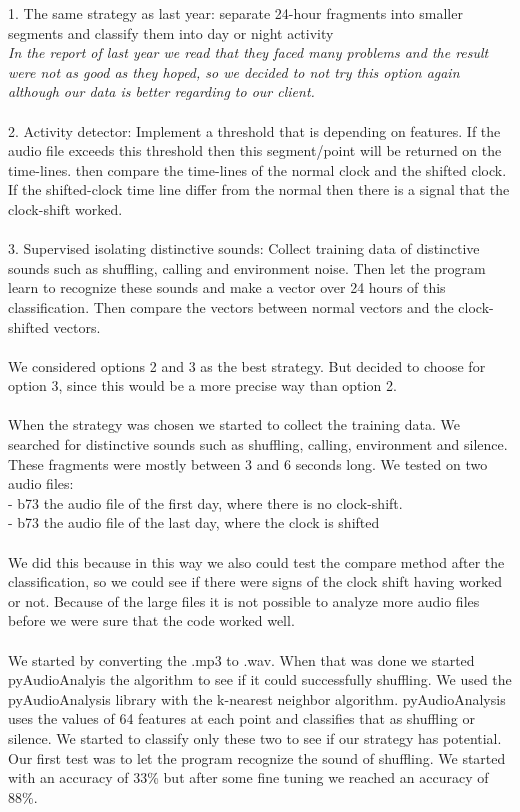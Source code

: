 \documentclass[a4paper]{article}
\begin{document}
1. The same strategy as last year: separate 24-hour fragments into smaller segments and classify them into day or night activity\\
\emph{In the report of last year we read that they faced many problems and the result were not as good as they hoped, so we decided to not try this option again although our data is better regarding to our client.}\\\\
2. Activity detector: Implement a threshold that is depending on features. If the audio file exceeds this threshold then this segment/point will be returned on the time-lines. then compare the time-lines of the normal clock and the shifted clock. If the shifted-clock time line differ from the normal then there is a signal that the clock-shift worked.\\\\
3. Supervised isolating distinctive sounds: Collect training data of distinctive sounds such as shuffling, calling and environment noise. Then let the program learn to recognize these sounds and make a vector over 24 hours of this classification. Then compare the vectors between normal vectors and the clock-shifted vectors. \\\\
We considered options 2 and 3 as the best strategy. But decided to choose for option 3, since this would be a more precise way than option 2. \\\\
When the strategy was chosen we started to collect the training data. We searched for distinctive sounds such as shuffling, calling, environment and silence. These fragments were mostly between 3 and  6 seconds long. We tested on two audio files:\\
- b73 the audio file of the first day, where there is no clock-shift. \\
- b73 the audio file of the last day, where the clock is shifted\\\\
We did this because in this way we also could test the compare method after the classification, so we could see if there were signs of the clock shift having worked or not. Because of the large files it is not possible to analyze more audio files before we were sure that the code worked well.\\\\
We started by converting the .mp3 to .wav. When that was done we started pyAudioAnalyis the algorithm to see if it could successfully shuffling. We used the pyAudioAnalysis library with the k-nearest neighbor algorithm. pyAudioAnalysis uses the values of 64 features at each point and classifies that as shuffling or silence. We started to classify only these two to see if our strategy has potential.  Our first test was to let the program recognize the sound of shuffling. We started with an accuracy of 33\% but after some fine tuning we reached an accuracy of 88\%.\\\\
\end{document}
